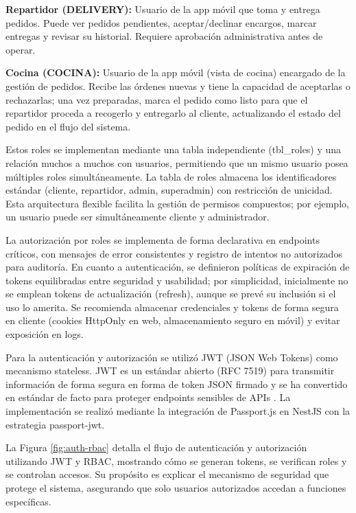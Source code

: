   \textbf{Repartidor (DELIVERY):} Usuario de la app móvil que toma y entrega pedidos. Puede ver pedidos pendientes, aceptar/declinar encargos, marcar entregas y revisar su historial. Requiere aprobación administrativa antes de operar.

  \textbf{Cocina (COCINA):} Usuario de la app móvil (vista de cocina) encargado de la gestión de pedidos. Recibe las órdenes nuevas y tiene la capacidad de aceptarlas o rechazarlas; una vez preparadas, marca el pedido como listo para que el repartidor proceda a recogerlo y entregarlo al cliente, actualizando el estado del pedido en el flujo del sistema.

  Estos roles se implementan mediante una tabla independiente (tbl\_roles) y una relación muchos a muchos con usuarios, permitiendo que un mismo usuario posea múltiples roles simultáneamente. La tabla de roles almacena los identificadores estándar (cliente, repartidor, admin, superadmin) con restricción de unicidad. Esta arquitectura flexible facilita la gestión de permisos compuestos; por ejemplo, un usuario puede ser simultáneamente cliente y administrador.

  La autorización por roles se implementa de forma declarativa en endpoints críticos, con mensajes de error consistentes y registro de intentos no autorizados para auditoría. En cuanto a autenticación, se definieron políticas de expiración de tokens equilibradas entre seguridad y usabilidad; por simplicidad, inicialmente no se emplean tokens de actualización (refresh), aunque se prevé su inclusión si el uso lo amerita. Se recomienda almacenar credenciales y tokens de forma segura en cliente (cookies HttpOnly en web, almacenamiento seguro en móvil) y evitar exposición en logs.

  Para la autenticación y autorización se utilizó JWT (JSON Web Tokens) como mecanismo stateless. JWT es un estándar abierto (RFC 7519) para transmitir información de forma segura en forma de token JSON firmado y se ha convertido en estándar de facto para proteger endpoints sensibles de APIs \parencite{Aguilera_JWT_NestJS}. La implementación se realizó mediante la integración de Passport.js en NestJS con la estrategia passport-jwt.

  La Figura \ref{fig:auth-rbac} detalla el flujo de autenticación y autorización utilizando JWT y RBAC, mostrando cómo se generan tokens, se verifican roles y se controlan accesos. Su propósito es explicar el mecanismo de seguridad que protege el sistema, asegurando que solo usuarios autorizados accedan a funciones específicas.


